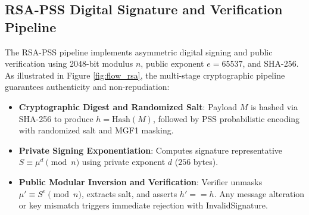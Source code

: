 \documentclass[12pt,a4paper]{report}
\renewcommand{\texttt}[1]{{\normalfont #1}}
\begin{document}
\clearpage

\subsection{RSA-PSS Digital Signature and Verification Pipeline}
The RSA-PSS pipeline implements asymmetric digital signing and public verification using 2048-bit modulus $n$, public exponent $e = 65537$, and SHA-256. As illustrated in Figure \ref{fig:flow_rsa}, the multi-stage cryptographic pipeline guarantees authenticity and non-repudiation:
\begin{itemize}[leftmargin=1.5em,topsep=1pt,itemsep=1pt,parsep=0pt]
    \item \textbf{Cryptographic Digest and Randomized Salt}: Payload $M$ is hashed via SHA-256 to produce $h = \text{Hash}(M)$, followed by PSS probabilistic encoding with randomized salt and MGF1 masking.
    \item \textbf{Private Signing Exponentiation}: Computes signature representative $S \equiv \mu^d \pmod n$ using private exponent $d$ ($256$ bytes).
    \item \textbf{Public Modular Inversion and Verification}: Verifier unmasks $\mu' \equiv S^e \pmod n$, extracts salt, and asserts $h' == h$. Any message alteration or key mismatch triggers immediate rejection with \texttt{InvalidSignature}.
\end{itemize}
\end{document}
